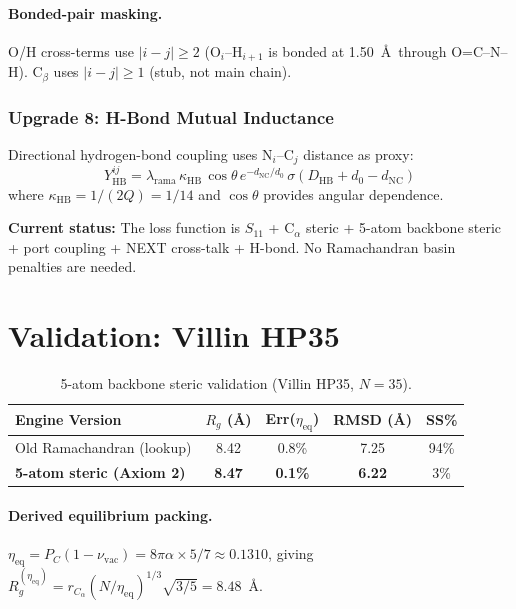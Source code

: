 \paragraph{Bonded-pair masking.}
O/H cross-terms use $|i-j| \geq 2$ (O$_i$--H$_{i+1}$ is bonded at 1.50~\AA\ through O=C--N--H).  C$_\beta$ uses $|i-j| \geq 1$ (stub, not main chain).

\subsubsection{Upgrade 8: H-Bond Mutual Inductance}

Directional hydrogen-bond coupling uses N$_i$--C$_j$ distance as proxy:
\begin{equation}
    Y_{\text{HB}}^{ij} = \lambda_\text{rama}\, \kappa_\text{HB}\, \cos\theta\, e^{-d_{\text{NC}}/d_0}\, \sigma(D_\text{HB} + d_0 - d_{\text{NC}})
\end{equation}
where $\kappa_\text{HB} = 1/(2Q) = 1/14$ and $\cos\theta$ provides angular dependence.

\textbf{Current status:} The loss function is $S_{11}$ + C$_\alpha$ steric + 5-atom backbone steric + port coupling + NEXT cross-talk + H-bond.  No Ramachandran basin penalties are needed.

\section{Validation: Villin HP35}
\label{sec:validation_results}

\begin{table}[H]
\centering
\caption{5-atom backbone steric validation (Villin HP35, $N=35$).}
\label{tab:validation_5atom}
\begin{tabular}{@{}l c c c c@{}}
\toprule
\textbf{Engine Version} & $R_g$ (\AA) & Err($\eta_\text{eq}$) & RMSD (\AA) & SS\% \\
\midrule
Old Ramachandran (lookup)          & 8.42 & 0.8\%         & 7.25 & 94\% \\
\textbf{5-atom steric (Axiom 2)}   & \textbf{8.47} & \textbf{0.1\%} & \textbf{6.22} & 3\%  \\
\bottomrule
\end{tabular}
\end{table}

\paragraph{Derived equilibrium packing.}
$\eta_\text{eq} = P_C(1 - \nu_\text{vac}) = 8\pi\alpha \times 5/7 \approx 0.1310$, giving $R_g^{(\eta_\text{eq})} = r_{C_\alpha} (N/\eta_\text{eq})^{1/3} \sqrt{3/5} = 8.48$~\AA.

